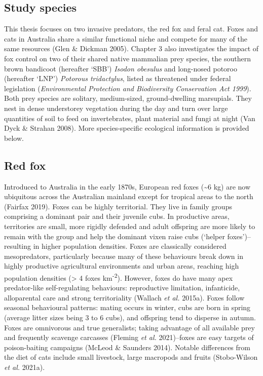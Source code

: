 \documentclass[11pt,a4paper,titlepage,twoside,openright]{style/unimelbthesis}
\begin{document}
\begin{mainmatter}
\hypertarget{study-species}{%
\section{Study species}\label{study-species}}

This thesis focuses on two invasive predators, the red fox and feral cat. Foxes and cats in Australia share a similar functional niche and compete for many of the same resources (Glen \& Dickman 2005). Chapter 3 also investigates the impact of fox control on two of their shared native mammalian prey species, the southern brown bandicoot (hereafter `SBB') \emph{Isodon obesulus} and long-nosed potoroo (hereafter `LNP') \emph{Potorous tridactylus}, listed as threatened under federal legislation (\emph{Environmental Protection and Biodiversity Conservation Act 1999}). Both prey species are solitary, medium-sized, ground-dwelling marsupials. They nest in dense understorey vegetation during the day and turn over large quantities of soil to feed on invertebrates, plant material and fungi at night (Van Dyck \& Strahan 2008). More species-specific ecological information is provided below.

\hypertarget{red-fox}{%
\subsection{Red fox}\label{red-fox}}

Introduced to Australia in the early 1870s, European red foxes (\textasciitilde6 kg) are now ubiquitous across the Australian mainland except for tropical areas to the north (Fairfax 2019). Foxes can be highly territorial. They live in family groups comprising a dominant pair and their juvenile cubs. In productive areas, territories are small, more rigidly defended and adult offspring are more likely to remain with the group and help the dominant vixen raise cubs (`helper foxes')--resulting in higher population densities. Foxes are classically considered mesopredators, particularly because many of these behaviours break down in highly productive agricultural environments and urban areas, reaching high population densities (\textgreater{} 4 foxes km\textsuperscript{-2}). However, foxes do have many apex predator-like self-regulating behaviours: reproductive limitation, infanticide, alloparental care and strong territoriality (Wallach \emph{et al.} 2015a). Foxes follow seasonal behavioural patterns: mating occurs in winter, cubs are born in spring (average litter sizes being 3 to 6 cubs), and offspring tend to disperse in autumn. Foxes are omnivorous and true generalists; taking advantage of all available prey and frequently scavenge carcasses (Fleming \emph{et al.} 2021)--foxes are easy targets of poison-baiting campaigns (McLeod \& Saunders 2014). Notable differences from the diet of cats include small livestock, large macropods and fruits (Stobo-Wilson \emph{et al.} 2021a).


\end{mainmatter}
\end{document}
